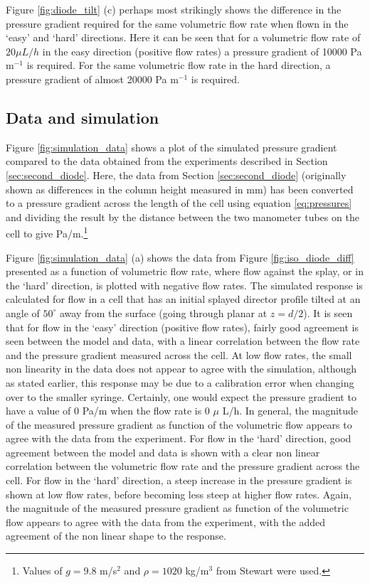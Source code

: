 Figure \ref{fig:diode_tilt} (c) perhaps most strikingly shows the difference in the pressure gradient required for the same volumetric flow rate when flown in the `easy' and `hard' directions. Here it can be seen that for a volumetric flow rate of $20 \mu L/h$ in the easy direction (positive flow rates) a pressure gradient of 10000 Pa m$^{-1}$ is required. For the same volumetric flow rate in the hard direction, a pressure gradient of almost 20000 Pa m$^{-1}$ is required.



\subsection{Data and simulation}
Figure \ref{fig:simulation_data} shows a plot of the simulated pressure gradient compared to the data obtained from the experiments described in Section \ref{sec:second_diode}. Here, the data from Section \ref{sec:second_diode} (originally shown as differences in the column height measured in mm) has been converted to a pressure gradient across the length of the cell using equation \ref{eq:pressures} and dividing the result by the distance between the two manometer tubes on the cell to give Pa/m.\footnote{Values of $g=9.8$ m/s$^2$ and $\rho=1020$ kg/m$^3$ from Stewart \cite{Stewart2004} were used.} 

Figure \ref{fig:simulation_data} (a) shows the data from Figure \ref{fig:iso_diode_diff} presented as a function of volumetric flow rate, where flow against the splay, or in the `hard' direction, is plotted with negative flow rates. The simulated response is calculated for flow in a cell that has an initial splayed director profile tilted at an angle of $50^{\circ}$ away from the surface (going through planar at $z=d/2$). It is seen that for flow in the `easy' direction (positive flow rates), fairly good agreement is seen between the model and data, with a linear correlation between the flow rate and the pressure gradient measured across the cell. At low flow rates, the small non linearity in the data does not appear to agree with the simulation, although as stated earlier, this response may be due to a calibration error when changing over to the smaller syringe. Certainly, one would expect the pressure gradient to have a value of 0 Pa/m when the flow rate is 0 $\mu$ L/h. In general, the magnitude of the measured pressure gradient as  function of the volumetric flow appears to agree with the data from the experiment. For flow in the `hard' direction, good agreement between the model and data is shown with a clear non linear correlation between the volumetric flow rate and the pressure gradient across the cell. For flow in the `hard' direction,  a steep increase in the pressure gradient is shown at low flow rates, before becoming less steep at higher flow rates. Again, the magnitude of the measured pressure gradient as function of the volumetric flow appears to agree with the data from the experiment, with the added agreement of the non linear shape to the response.


